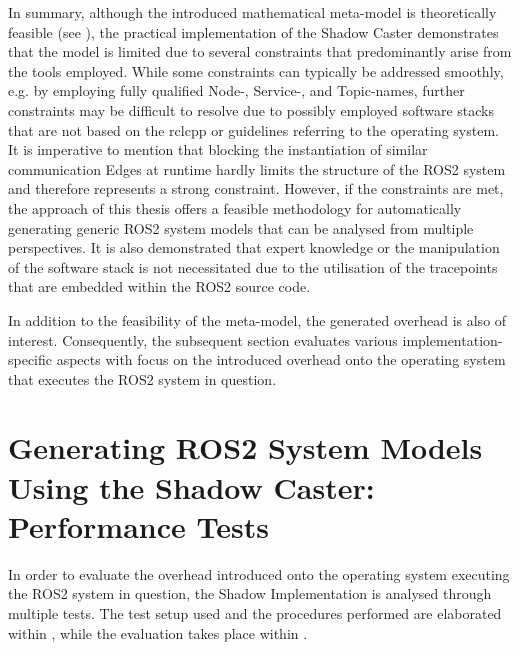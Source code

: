     In summary, although the introduced mathematical meta-model is theoretically feasible (see ), the practical implementation of the Shadow Caster demonstrates that the model is limited due to several constraints that predominantly arise from the tools employed. While some constraints can typically be addressed smoothly, e.g. by employing fully qualified Node-, Service-, and Topic-names, further constraints may be difficult to resolve due to possibly employed software stacks that are not based on the rclcpp or guidelines referring to the operating system. It is imperative to mention that blocking the instantiation of similar communication Edges at runtime hardly limits the structure of the ROS2 system and therefore represents a strong constraint.\newline
    However, if the constraints are met, the approach of this thesis offers a feasible methodology for automatically generating generic ROS2 system models that can be analysed from multiple perspectives. It is also demonstrated that expert knowledge or the manipulation of the software stack is not necessitated due to the utilisation of the tracepoints that are embedded within the ROS2 source code.

    In addition to the feasibility of the meta-model, the generated overhead is also of interest. Consequently, the subsequent section evaluates various implementation-specific aspects with focus on the introduced overhead onto the operating system that executes the ROS2 system in question.


\section{Generating ROS2 System Models Using the Shadow Caster: Performance Tests} \label{sec:eval:performanceTests}
    In order to evaluate the overhead introduced onto the operating system executing the ROS2 system in question, the Shadow Implementation is analysed through multiple tests. The test setup used and the procedures performed are elaborated within , while the evaluation takes place within .


